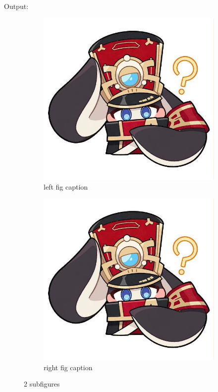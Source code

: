 \documentclass [xcolor=svgnames, t] {beamer}
\begin{document}
\begin{frame}
    Output: 
    \begin{figure}
        \centering
        \begin{subfigure}{0.3\textwidth}
            \centering
            \includegraphics[width=\textwidth]{figures/pamu}
            \caption{left fig caption}
            \label{fig: subfig1}
        \end{subfigure}
        \begin{subfigure}{0.3\textwidth}
            \centering
            \includegraphics[width=\textwidth]{figures/pamu}
            \caption{right fig caption}
            \label{fig: subfig2}
        \end{subfigure}
        \caption{2 subfigures}
    \end{figure}


\end{frame}
\end{document}
